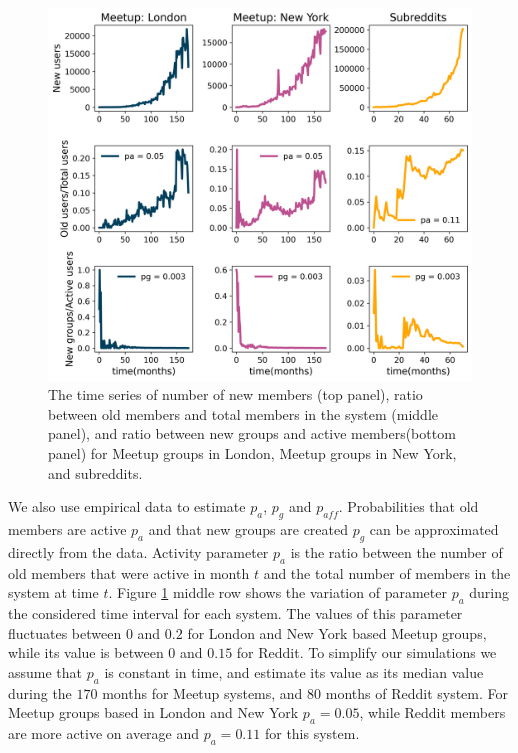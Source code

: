 \begin{figure}[h!]
	\centering
	\includegraphics[width=0.8\linewidth]{Figures/figures/Fig3.png}
	\caption{The time series of number of new members (top panel), ratio between old members and total members in the system (middle panel), and ratio between new groups and active members(bottom panel) for Meetup groups in London,  Meetup groups in New York, and subreddits. }
	\label{fig:fig5}
\end{figure}
We also use empirical data to estimate $p_{a}$, $p_{g}$ and $p_{aff}$. Probabilities that old members are active $p_a$ and that new groups are created $p_g$ can be approximated directly from the data. Activity parameter $p_{a}$ is the ratio between the number of old members that were active in month $t$ and the total number of members in the system at time $t$. Figure \ref{fig:fig5} middle row shows the variation of parameter $p_{a}$ during the considered time interval for each system. The values of this parameter fluctuates between $0$ and $0.2$ for London and New York based Meetup groups, while its value is between $0$ and $0.15$ for Reddit. To simplify our simulations we assume that $p_{a}$ is constant in time, and estimate its value as its median value during the $170$ months for Meetup systems, and $80$ months of Reddit system. For Meetup groups based in London and New York $p_{a}=0.05$, while Reddit members are more active on average and $p_{a}=0.11$ for this system.\\
